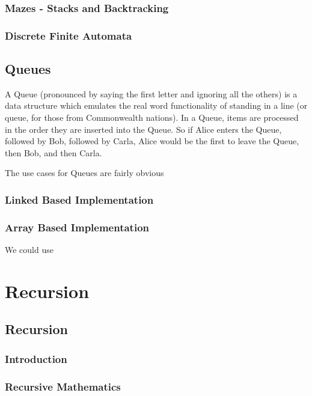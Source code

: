 \documentclass[10pt,a4paper]{book}
\begin{document}
\section{Mazes - Stacks and Backtracking}



\section{Discrete Finite Automata}

\chapter{Queues}

A Queue (pronounced by saying the first letter and ignoring all the others) is a data structure which emulates the real word functionality of standing in a line (or queue, for those from Commonwealth nations).  
In a Queue, items are processed in the order they are inserted into the Queue.  So if Alice enters the Queue, followed by Bob, followed by Carla, Alice would be the first to leave the Queue, then Bob, and then Carla.

The use cases for Queues are fairly obvious

\section{Linked Based Implementation} 
\section{Array Based Implementation}
We could use 

\part{Recursion}
\chapter{Recursion}

\section{Introduction}

\section{Recursive Mathematics}
\end{document}
